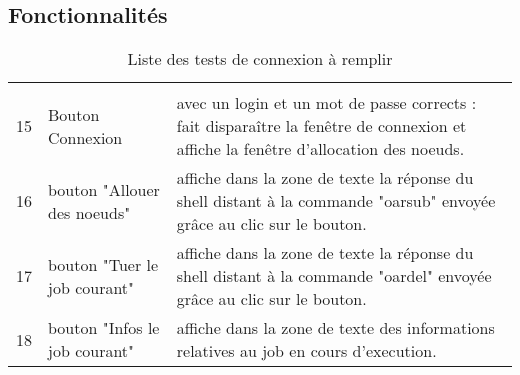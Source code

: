 \subsection{Fonctionnalités}
\label{sec:fonctions}

\begin{table}[h!]
  \centering
  \begin{tabular}[h!]{|c|p{3cm}|p{10cm}|}
\hline \\
    15 & Bouton Connexion & avec un login et un mot de passe corrects : fait disparaître la fenêtre de connexion et affiche la fenêtre d'allocation des noeuds.\\
    16 & bouton "Allouer des noeuds" & affiche dans la zone de texte la réponse du shell distant à la commande "oarsub" envoyée grâce au clic sur le bouton.\\
    17 & bouton "Tuer le job courant" & affiche dans la zone de texte la réponse du shell distant à la commande "oardel" envoyée grâce au clic sur le bouton.\\
    18 & bouton "Infos le job courant" & affiche dans la zone de texte des informations relatives au job en cours d'execution.\\
\hline
  \end{tabular}
  \caption{Liste des tests de connexion à remplir}
  \label{tab:tests_connexion}
\end{table}

